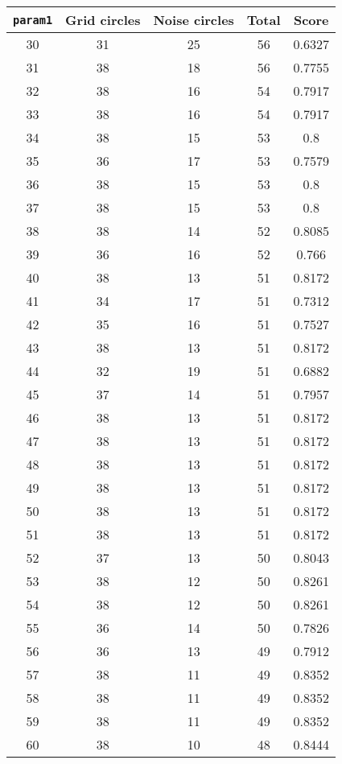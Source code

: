 \documentclass[letterpaper, 12pt]{article}
\begin{document}
\begin{longtable}{|c|c|c|c|c|}
\hline
\textbf{\texttt{param1}} & \textbf{Grid circles} & \textbf{Noise circles} & \textbf{Total} & \textbf{Score} \\
\hline
30 & 31 & 25 & 56 & 0.6327 \\
\hline
31 & 38 & 18 & 56 & 0.7755 \\
\hline
32 & 38 & 16 & 54 & 0.7917 \\
\hline
33 & 38 & 16 & 54 & 0.7917 \\
\hline
34 & 38 & 15 & 53 & 0.8 \\
\hline
35 & 36 & 17 & 53 & 0.7579 \\
\hline
36 & 38 & 15 & 53 & 0.8 \\
\hline
37 & 38 & 15 & 53 & 0.8 \\
\hline
38 & 38 & 14 & 52 & 0.8085 \\
\hline
39 & 36 & 16 & 52 & 0.766 \\
\hline
40 & 38 & 13 & 51 & 0.8172 \\
\hline
41 & 34 & 17 & 51 & 0.7312 \\
\hline
42 & 35 & 16 & 51 & 0.7527 \\
\hline
43 & 38 & 13 & 51 & 0.8172 \\
\hline
44 & 32 & 19 & 51 & 0.6882 \\
\hline
45 & 37 & 14 & 51 & 0.7957 \\
\hline
46 & 38 & 13 & 51 & 0.8172 \\
\hline
47 & 38 & 13 & 51 & 0.8172 \\
\hline
48 & 38 & 13 & 51 & 0.8172 \\
\hline
49 & 38 & 13 & 51 & 0.8172 \\
\hline
50 & 38 & 13 & 51 & 0.8172 \\
\hline
51 & 38 & 13 & 51 & 0.8172 \\
\hline
52 & 37 & 13 & 50 & 0.8043 \\
\hline
53 & 38 & 12 & 50 & 0.8261 \\
\hline
54 & 38 & 12 & 50 & 0.8261 \\
\hline
55 & 36 & 14 & 50 & 0.7826 \\
\hline
56 & 36 & 13 & 49 & 0.7912 \\
\hline
57 & 38 & 11 & 49 & 0.8352 \\
\hline
58 & 38 & 11 & 49 & 0.8352 \\
\hline
59 & 38 & 11 & 49 & 0.8352 \\
\hline
60 & 38 & 10 & 48 & 0.8444 \\

\end{longtable}
\end{document}
